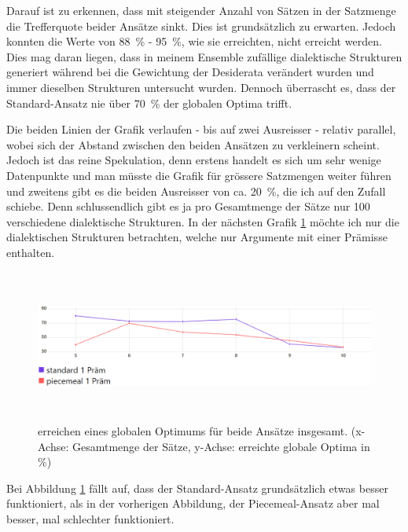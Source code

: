 \documentclass{article}
\begin{document}
Darauf ist zu erkennen, dass mit steigender Anzahl von Sätzen in der Satzmenge die Trefferquote beider Ansätze sinkt. Dies ist grundsätzlich zu erwarten. Jedoch konnten die Werte von 88~\% - 95~\%, wie sie \autocite[S.~455]{beisbart_making_2021} erreichten, nicht erreicht werden. Dies mag daran liegen, dass in meinem Ensemble zufällige dialektische Strukturen generiert während bei \autocite{beisbart_making_2021} die Gewichtung der Desiderata verändert wurden und immer dieselben Strukturen untersucht wurden. Dennoch überrascht es, dass der Standard-Ansatz nie über 70~\% der globalen Optima trifft.

Die beiden Linien der Grafik verlaufen - bis auf zwei Ausreisser - relativ parallel, wobei sich der Abstand zwischen den beiden Ansätzen zu verkleinern scheint. Jedoch ist das reine Spekulation, denn erstens handelt es sich um sehr wenige Datenpunkte und man müsste die Grafik für grössere Satzmengen weiter führen und zweitens gibt es die beiden Ausreisser von ca. 20~\%, die ich auf den Zufall schiebe. Denn schlussendlich gibt es ja pro Gesamtmenge der Sätze nur 100 verschiedene dialektische Strukturen. In der nächsten Grafik \ref{fig:GlobOptPoolsizeLineOnePrem} möchte ich nur die dialektischen Strukturen betrachten, welche nur Argumente mit einer Prämisse enthalten.

\begin{figure}[t]
  \centering
  \includegraphics[width=\textwidth,height=5cm,keepaspectratio]{images/global_optima_standard_piecemeal_1prem.png}
  \caption{erreichen eines globalen Optimums für beide Ansätze insgesamt. (x-Achse: Gesamtmenge der Sätze, y-Achse: erreichte globale Optima in \%) \label{fig:GlobOptPoolsizeLineOnePrem}}
\end{figure}

Bei Abbildung \ref{fig:GlobOptPoolsizeLineOnePrem} fällt auf, dass der Standard-Ansatz grundsätzlich etwas besser funktioniert, als in der vorherigen Abbildung, der Piecemeal-Ansatz aber mal besser, mal schlechter funktioniert.
\end{document}
